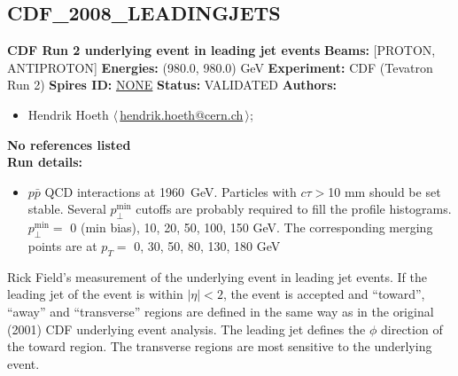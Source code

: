 \subsection{CDF\_2008\_LEADINGJETS}
\textbf{CDF Run 2 underlying event in leading jet events}\newline
\textbf{Beams:} [PROTON, ANTIPROTON] \newline
\textbf{Energies:} (980.0, 980.0) GeV \newline
\textbf{Experiment:} CDF (Tevatron Run 2) \newline
\textbf{Spires ID:} \href{http://www.slac.stanford.edu/spires/find/hep/www?rawcmd=key+NONE}{NONE}\newline
\textbf{Status:} VALIDATED\newline
\textbf{Authors:}
\begin{itemize}
  \item Hendrik Hoeth $\langle\,$\href{mailto:hendrik.hoeth@cern.ch}{hendrik.hoeth@cern.ch}$\,\rangle$;
\end{itemize}
\textbf{No references listed}\\ 
\textbf{Run details:}
\begin{itemize}

  \item $p\bar{p}$ QCD interactions at 1960~GeV. Particles with $c \tau > {}$10 mm should be set stable. Several $p_\perp^\text{min}$ cutoffs are probably required to fill the profile histograms. $p_\perp^\text{min} = {}$ 0 (min bias), 10, 20, 50, 100, 150 GeV. The corresponding merging points are at $p_T = $ 0, 30, 50, 80, 130, 180 GeV\end{itemize}

\noindent Rick Field's measurement of the underlying event in leading jet events. If the leading jet of the event is within $|\eta| < 2$, the event is accepted and ``toward'', ``away'' and ``transverse'' regions are defined in the same way as in the original (2001) CDF underlying event analysis. The leading jet defines the $\phi$ direction of the toward region. The transverse regions are most sensitive to the underlying event.

\clearpage


\clearpage

